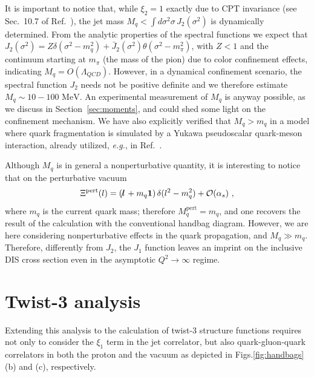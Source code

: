 \documentclass[preprintnumbers,floatfix,nofootinbib]{revtex4}
\newcommand{\lslash}{l \hspace{-0.19cm} / \,}
\newcommand{\mj}{M_q}
\newcommand{\mq}{m_q}
\newcommand{\id}{{\bm 1}
}
\begin{document}
It is important to notice that, while $\xi_2=1$ exactly due to CPT invariance
(see Sec.~10.7 of Ref.~\cite{Weinberg:1995mt}), the jet mass
$\mj < \int d\sigma^2 \sigma \, J_2(\sigma^2)$ is dynamically determined. From the analytic properties of the spectral functions we expect that $J_2(\sigma^2) = Z \delta(\sigma^2-m_q^2) + \bar J_2(\sigma^2) \theta (\sigma^2-m_\pi^2)$, with $Z<1$ and the continuum starting at $m_\pi$ (the mass of the pion) due to color confinement effects, indicating $M_q=O(\Lambda_{QCD})$. However, in a dynamical confinement scenario, the spectral function $J_2$ needs not be positive definite \cite{Roberts:2016vyn} and we therefore estimate
$
  M_q\sim 10-100 \text{\ MeV}.
$
An experimental measurement of $M_q$ is anyway possible, as we discuss in Section~\ref{sec:moments}, and could shed some light on the confinement mechanism. We have also explicitly verified that $M_q>m_q$ in a model where quark fragmentation is simulated by a Yukawa pseudoscalar quark-meson interaction, already utilized, {\it e.g.}, in Ref.~\cite{Bacchetta:2001di}.



Although $\mj$ is in general a nonperturbative quantity, it is interesting to
notice that on the perturbative vacuum
\begin{align}
  \Xi^{\text{pert}}(l) = (\lslash + \mq \id) \, \delta(l^2-m_q^2) + {\cal O}(\alpha_s) \ ,
\end{align}
where $\mq$ is the current quark mass; therefore $\mj^\text{pert}=m_q$, and one recovers the result of the calculation with the conventional handbag diagram.
However, we are here considering nonperturbative effects
in the quark propagation, and $\mj \gg \mq$. 
Therefore, differently from $J_2$, the $J_1$ function leaves an imprint on the inclusive DIS cross section even in the asymptotic $Q^2 \to \infty$ regime. 


\section{Twist-3 analysis}

Extending this analysis to the calculation of twist-3
structure functions requires not only to consider the $\xi_1$ term in the jet
correlator, but also quark-gluon-quark correlators in both the proton and the
vacuum as depicted in Figs.\ref{fig:handbags}(b) and (c), respectively. 
\end{document}
